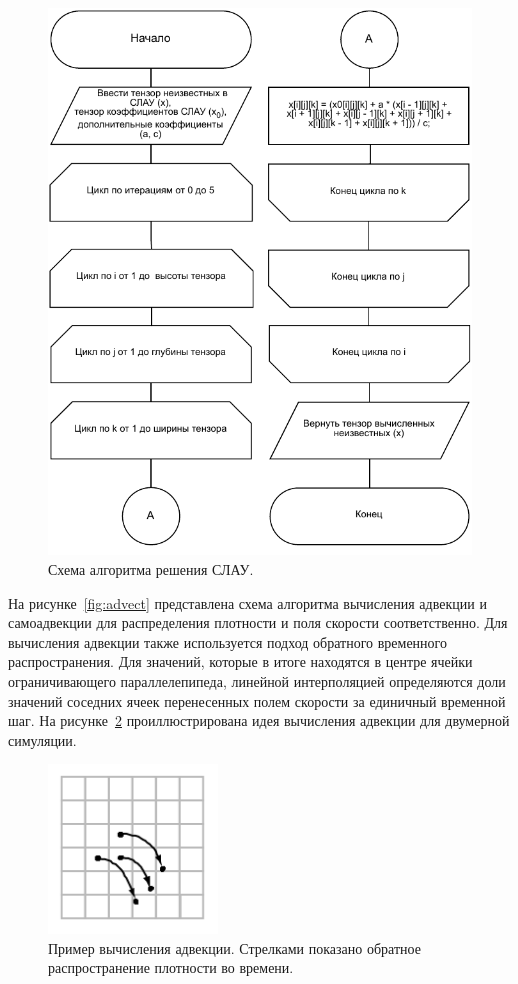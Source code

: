\begin{figure}[H]
	\centering
	\includegraphics[width=1.0\textwidth,page=1]{assets/img/gauss-zeidel.pdf}
	\caption{Схема алгоритма решения СЛАУ.}
	\label{fig:lin_solve}
\end{figure}

На рисунке~\ref{fig:advect} представлена схема алгоритма вычисления адвекции и самоадвекции для распределения плотности и поля скорости соответственно. Для вычисления адвекции также используется подход обратного временного распространения. Для значений, которые в итоге находятся в центре ячейки ограничивающего параллелепипеда, линейной интерполяцией определяются доли значений соседних ячеек перенесенных полем скорости за единичный временной шаг. На рисунке~\ref{fig:advect_idea} проиллюстрирована идея вычисления адвекции для двумерной симуляции.

\begin{figure}[H]
	\centering
	\includegraphics[width=0.4\textwidth,page=1]{assets/img/advect.png}
	\caption{Пример вычисления адвекции. Стрелками показано обратное распространение плотности во времени.}
	\label{fig:advect_idea}
\end{figure}

